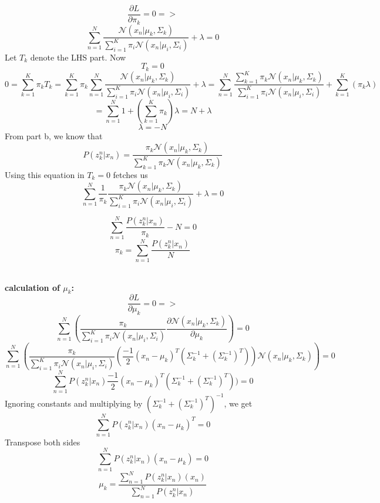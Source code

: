 \documentclass[twoside,10pt]{article}
\begin{document}
$$ \frac{\partial L}{\partial \pi_k}  = 0 => $$
$$\sum_{n = 1}^{N} {\frac{\mathcal{N}{(x_n|\mu_k,\Sigma_k)}}{\sum_{i = 1}^{K}{\pi_i\mathcal{N}{(x_n|\mu_i,\Sigma_i)}}}} + \lambda = 0$$
Let $T_k$ denote the LHS part. Now
$$ T_k = 0 $$
$$ 0 = \sum_{k=1}^{K}{\pi_k T_k} = \sum_{k=1}^{K} {\pi_k \sum_{n = 1}^{N} {\frac{\mathcal{N}{(x_n|\mu_k,\Sigma_k)}}{\sum_{i = 1}^{K}{\pi_i\mathcal{N}{(x_n|\mu_i,\Sigma_i)}}}} + \lambda }  = \sum_{n=1}^{N} {  {\frac{\sum_{k = 1}^{K}{\pi_k\mathcal{N}{(x_n|\mu_k,\Sigma_k)}}}{\sum_{i = 1}^{K}{\pi_i\mathcal{N}{(x_n|\mu_i,\Sigma_i)}}}} } +\sum_{k=1}^{K}{(\pi_k \lambda)}$$
$$ = \sum_{n=1}^{N} {  1 } +(\sum_{k=1}^{K}{\pi_k}) \lambda = N + \lambda $$
$$ \lambda = -N $$
From part b, we know that 
$$P(z_k^n|x_n) = \frac{{\pi_k} \mathcal{N}(x_n|\mu_k,\Sigma_k)}
{\sum_{k = 1}^{K} { {\pi_k} \mathcal{N}(x_n|\mu_k,\Sigma_k)}} $$
Using this equation in $T_k = 0$ fetches us
$$ \sum_{n = 1}^{N} {\frac{1}{\pi_k} \frac{\pi_k \mathcal{N}{(x_n|\mu_k,\Sigma_k)}}{\sum_{i = 1}^{K}{\pi_i\mathcal{N}{(x_n|\mu_i,\Sigma_i)}}}} + \lambda = 0 $$

$$ \sum_{n = 1}^{N} {\frac{P(z_k^n|x_n)}{\pi_k} } - N = 0 $$
$$\boxed{ \pi_k = \sum_{n = 1}^{N} {\frac{P(z_k^n|x_n)}{N} } } $$\\
\vspace{0.5cm}

\textbf{calculation of $\mu_k$:}\\
$$ \frac{\partial L}{\partial \mu_k}  = 0 => $$
$$ \sum_{n = 1}^{N} {(\frac{\pi_k}{\sum_{i = 1}^{K}{\pi_i\mathcal{N}{(x_n|\mu_i,\Sigma_i)}}} \frac{\partial \mathcal{N}{(x_n|\mu_k,\Sigma_k)}}{\partial \mu_k}  )} = 0 $$
$$ \sum_{n = 1}^{N} {(\frac{\pi_k}{\sum_{i = 1}^{K}{\pi_i\mathcal{N}{(x_n|\mu_i,\Sigma_i)}}}( \frac{-1}{2}(x_n-\mu_k)^T(\Sigma_k^{-1}+(\Sigma_k^{-1})^T)  ) \mathcal{N}{(x_n|\mu_k,\Sigma_k)}) } = 0 $$
$$ \sum_{n = 1}^{N} { P(z_k^n|x_n)  \frac{-1}{2}(x_n-\mu_k)^T(\Sigma_k^{-1}+(\Sigma_k^{-1})^T)  )  } = 0 $$
Ignoring constants and multiplying by $(\Sigma_k^{-1}+(\Sigma_k^{-1})^T)^{-1} $, we get 
$$ \sum_{n = 1}^{N} { P(z_k^n|x_n) (x_n-\mu_k)^T    } = 0 $$
Transpose both sides
$$ \sum_{n = 1}^{N} { P(z_k^n|x_n) (x_n-\mu_k)    } = 0 $$
$$
\boxed{
\mu_k = \frac{\sum_{n = 1}^{N} { P(z_k^n|x_n) (x_n)  }}{ \sum_{n = 1}^{N} { P(z_k^n|x_n)} }  
}$$\\
\vspace{0.5cm}
\end{document}
